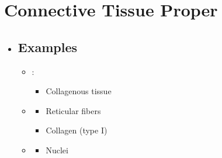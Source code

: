 \section{Connective Tissue Proper}
\begin{itemize}
  \item[]
  
  \subsection{Examples}
  \begin{multicols}{2}
  \begin{itemize}
    \item {}:


    \begin{itemize}
      \item Collagenous tissue
      \begin{center}
      \end{center}
    \end{itemize}


    \item {}


    \begin{multicols}{2}
    \begin{itemize}
      \item Reticular fibers
      
      
      \item Collagen (type I)
      
    \end{itemize}
    \end{multicols}

    \item {}


    \begin{multicols}{2}
      \begin{itemize}
        \item Nuclei
        
        

\end{itemize}
\end{multicols}
\end{itemize}
\end{multicols}
\end{itemize}
